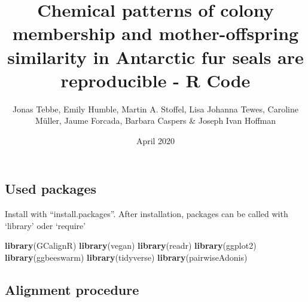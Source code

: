\documentclass[]{article}
\title{Chemical patterns of colony membership and mother-offspring similarity
in Antarctic fur seals are reproducible - R Code}
\author{Jonas Tebbe, Emily Humble, Martin A. Stoffel, Lisa Johanna Tewes,
Caroline Müller, Jaume Forcada, Barbara Caspers \& Joseph Ivan Hoffman}
\date{April 2020}
\newenvironment{Shaded}{\begin{snugshade}}{\end{snugshade}}
\newcommand{\KeywordTok}[1]{\textcolor[rgb]{0.13,0.29,0.53}{\textbf{#1}}}
\newcommand{\NormalTok}[1]{#1}
\begin{document}
\maketitle

\subsection{Used packages}\label{used-packages}

Install with ``install.packages''. After installation, packages can be
called with `library' oder `require'

\begin{Shaded}
\begin{Highlighting}[]
\KeywordTok{library}\NormalTok{(GCalignR)}
\KeywordTok{library}\NormalTok{(vegan)}
\KeywordTok{library}\NormalTok{(readr)}
\KeywordTok{library}\NormalTok{(ggplot2)}
\KeywordTok{library}\NormalTok{(ggbeeswarm)}
\KeywordTok{library}\NormalTok{(tidyverse)}
\KeywordTok{library}\NormalTok{(pairwiseAdonis)}
\end{Highlighting}
\end{Shaded}

\subsection{Alignment procedure}\label{alignment-procedure}
\end{document}

